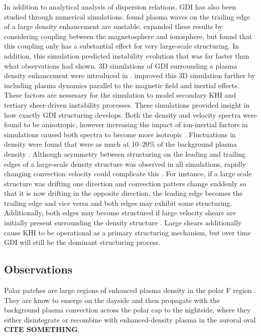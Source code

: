 In addition to analytical analysis of dispersion relations, GDI has also been studied through numerical simulations.  \citet{Keskinen1982} found plasma waves on the trailing edge of a large density enhancement are unstable.  \citet{Keskinen1990} expanded these results by considering coupling between the magnetosphere and ionosphere, but found that this coupling only has a substantial effect for very large-scale structuring.  In addition, this simulation predicted instability evolution that was far faster than what observations had shown.  3D simulations of GDI surrounding a plasma density enhancement were introduced in \citet{Guzdar1998}.  \citet{Gondarenko1999} improved this 3D simulation further by including plasma dynamics parallel to the magnetic field and inertial effects.  These factors are nessesary for the simulation to model secondary KHI and tertiary sheer-driven instability processes.  These simulations provided insight in how exactly GDI structuring develops.  Both the density and velocity spectra were found to be anisotropic, however increasing the impact of ion-inertial factors in simulations caused both spectra to become more isotropic \citep{Gondarenko2001}.  Fluctuations in density were found that were as much at 10--20\% of the background plasma density \citep{Gondarenko2004a}.  Although asymmetry between structuring on the leading and trailing edges of a large-scale density structure was observed in all simulations, rapidly changing convection velocity could complicate this \citep{Gondarenko2004b}.  For instance, if a large scale structure was drifting one direction and convection patters change suddenly so that it is now drifting in the opposite direction, the leading edge becomes the trailing edge and vice versa and both edges may exhibit some structuring.  Additionally, both edges may become structured if large velocity shears are initially present surrounding the density structure \citep{Gondarenko2006}.  Large shears additionally cause KHI to be operational as a primary structuring mechanism, but over time GDI will still be the dominant structuring process.

\subsection{Observations}

Polar patches are large regions of enhanced plasma density in the polar F region \citep[][e.g.]{Weber1984,Buchau1985}.  They are know to emerge on the dayside and then propagate with the background plasma convection across the polar cap to the nightside, where they either disintegrate or recombine with enhanced-density plasma in the auroral oval \textbf{CITE SOMETHING}.


